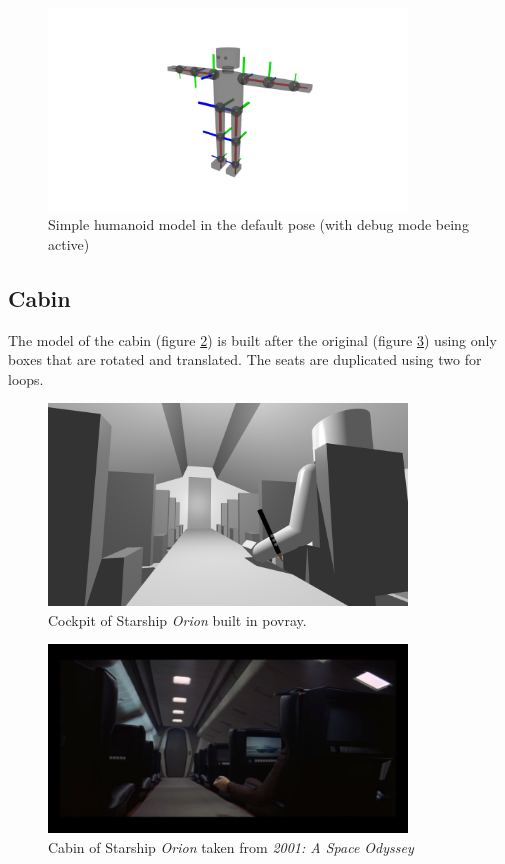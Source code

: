 \begin{figure}[ht]
	\centering
	\includegraphics[width=0.85\textwidth]{images/human.png}
	\caption{Simple humanoid model in the default pose (with debug mode being active)}
	\label{fig_human}
\end{figure}

\subsection{Cabin}

The model of the cabin (figure \ref{cabin}) is built after the original (figure \ref{cabin_original}) using only boxes that are rotated and translated. The seats are duplicated using two for loops.

\begin{figure}[ht]
	\centering
	\includegraphics[width=0.85\textwidth]{images/cabin.png}
	\caption{Cockpit of Starship \textit{Orion} built in povray.}
	\label{cabin}
\end{figure}

\begin{figure}[ht]
	\centering
	\includegraphics[width=0.85\textwidth]{images/cabin_original.png}
	\caption{Cabin of Starship \textit{Orion} taken from \textit{2001: A Space Odyssey}}
	\label{cabin_original}
\end{figure}

